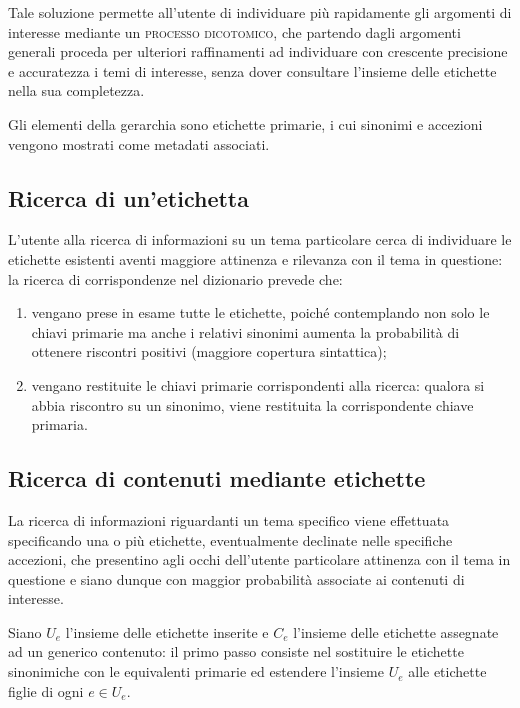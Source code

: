 \documentclass[10pt,a4paper,headinclude,footinclude,hidelinks]{scrreprt} %
\begin{document}
	Tale soluzione permette all'utente di individuare più rapidamente gli argomenti di interesse mediante un \textsc{processo dicotomico}, che partendo dagli argomenti generali proceda per ulteriori raffinamenti ad individuare con crescente precisione e accuratezza i temi di interesse, senza dover consultare l'insieme delle etichette nella sua completezza.

	Gli elementi della gerarchia sono etichette primarie, i cui sinonimi e accezioni vengono mostrati come metadati associati. 
	\subsection{Ricerca di un'etichetta}
	L'utente alla ricerca di informazioni su un tema particolare cerca di individuare le etichette esistenti aventi maggiore attinenza e rilevanza con il tema in questione: la ricerca di corrispondenze nel dizionario prevede che:
	\begin{enumerate}
	\item vengano prese in esame tutte le etichette, poiché contemplando non solo le chiavi primarie ma anche i relativi sinonimi aumenta la probabilità di ottenere riscontri positivi (maggiore copertura sintattica);
	\item vengano restituite le chiavi primarie corrispondenti alla ricerca: qualora si abbia riscontro su un sinonimo, viene restituita la corrispondente chiave primaria.
	\end{enumerate}

	\subsection{Ricerca di contenuti mediante etichette}
	La ricerca di informazioni riguardanti un tema specifico viene effettuata specificando una o più etichette, eventualmente declinate nelle specifiche accezioni, che presentino agli occhi dell'utente particolare attinenza con il tema in questione e siano dunque con maggior probabilità associate ai contenuti di interesse.

	Siano $U_e$ l'insieme delle etichette inserite e $C_e$ l'insieme delle etichette assegnate ad un generico contenuto: il primo passo consiste nel sostituire le etichette sinonimiche con le equivalenti primarie ed estendere l'insieme $U_e$ alle etichette figlie di ogni $e \in U_e$.
\end{document}
